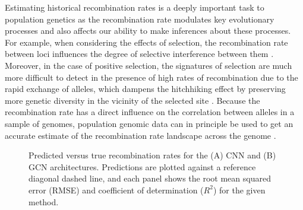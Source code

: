 Estimating historical recombination rates is a deeply important task to population genetics as the recombination rate modulates key evolutionary processes and also affects our ability to make inferences about these processes. For example, when considering the effects of selection, the recombination rate between loci influences the degree of selective interference between them \cite{hillEffectLinkageLimits1966}. Moreover, in the case of positive selection, the signatures of selection are much more difficult to detect in the presence of high rates of recombination due to the rapid exchange of alleles, which dampens the hitchhiking effect by preserving more genetic diversity in the vicinity of the selected site \cite{shrinerPotentialImpactRecombination2003}. Because the recombination rate has a direct influence on the correlation between alleles in a sample of genomes, population genomic data can in principle be used to get an accurate estimate of the recombination rate landscape across the genome \cite{adrionPredictingLandscapeRecombination2020,autonRecombinationRateEstimation2007,chanGenomeWideFineScaleRecombination2012,gaoNewSoftwareFast2016,hudsonTwolocusSamplingDistributions2001}. 

\begin{figure}
    \centering
    \caption[Predicted versus true recombination rates for the (A) CNN and (B) GCN architectures]{Predicted versus true recombination rates for the (A) CNN and (B) GCN architectures. Predictions are plotted against a reference diagonal dashed line, and each panel shows the root mean squared error (RMSE) and coefficient of determination ($R^2$) for the given method.}
    \label{fig:2_2}
\end{figure}

